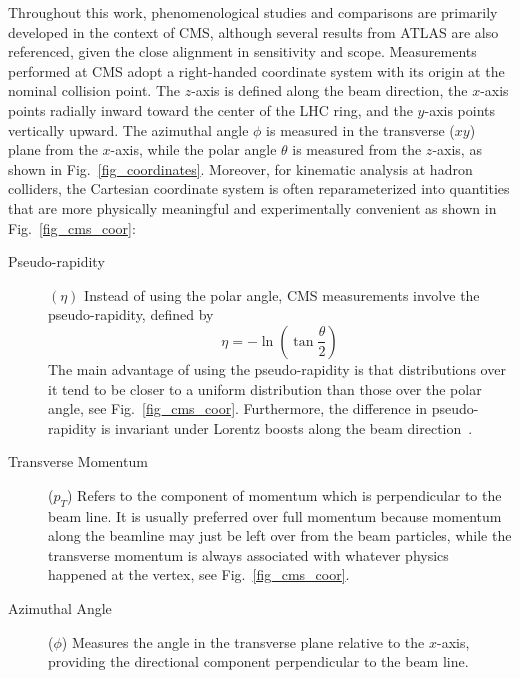 Throughout this work, phenomenological studies and comparisons are primarily developed in the context of CMS, although several results from ATLAS are also referenced, given the close alignment in sensitivity and scope. Measurements performed at CMS adopt a right-handed coordinate system with its origin at the nominal collision point. The $z$-axis is defined along the beam direction, the $x$-axis points radially inward toward the center of the LHC ring, and the $y$-axis points vertically upward. The azimuthal angle $\phi$ is measured in the transverse ($xy$) plane from the $x$-axis, while the polar angle $\theta$ is measured from the $z$-axis, as shown in Fig.~\ref{fig_coordinates}. Moreover, for kinematic analysis at hadron colliders, the Cartesian coordinate system is often reparameterized into quantities that are more physically meaningful and experimentally convenient as shown in Fig.~\ref{fig_cms_coor}:

\begin{description}
	\item[Pseudo-rapidity] $(\eta)$ Instead of using the polar angle, CMS measurements involve the pseudo-rapidity, defined by
	$$
	\eta=-\ln \left(\tan \frac{\theta}{2}\right)
	$$
	The main advantage of using the pseudo-rapidity is that distributions over it tend to be closer to a uniform distribution than those over the polar angle, see Fig.~\ref{fig_cms_coor}. Furthermore, the difference in pseudo-rapidity is invariant under Lorentz boosts along the beam direction~\parencite{book:1123430}.
	
	\item[Transverse Momentum] ($p_T$) Refers to the component of momentum which is perpendicular to the beam line. It is usually preferred over full momentum because momentum along the beamline may just be left over from the beam particles, while the transverse momentum is always associated with whatever physics happened at the vertex, see Fig.~\ref{fig_cms_coor}.
	
	\item[Azimuthal Angle] ($\phi$) Measures the angle in the transverse plane relative to the $x$-axis, providing the directional component perpendicular to the beam line.
\end{description}

\begin{center}
  
  \label{fig_cms_coor}
\end{center}

